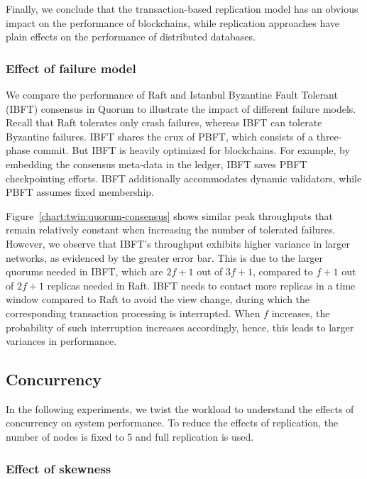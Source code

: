 Finally, we conclude that the transaction-based replication model has an obvious
impact on the performance of blockchains, while replication approaches have plain
effects on the performance of distributed databases.

\subsubsection{Effect of failure model}
\label{sec:twin:exp:replication:consensus}
We compare the performance of Raft and Istanbul Byzantine Fault Tolerant (IBFT)
consensus in Quorum to illustrate the impact of different failure models.
Recall that Raft tolerates only crash failures, whereas IBFT can tolerate
Byzantine failures.
IBFT shares the crux of PBFT, which consists of a three-phase commit.
But IBFT is heavily optimized for blockchains.
For example, by embedding the consensus meta-data in the ledger, IBFT saves PBFT
checkpointing efforts.
IBFT additionally accommodates dynamic validators, while PBFT assumes fixed
membership.


Figure~\ref{chart:twin:quorum-consensus} shows similar peak throughputs that remain
relatively constant when increasing the number of tolerated failures.
However, we observe that IBFT's throughput exhibits higher variance in larger
networks, as evidenced by the greater error bar. This is due to the larger
quorums needed in IBFT, which are $2f+1$ out of $3f+1$, compared to $f+1$ out of
$2f+1$ replicas needed in Raft.
IBFT needs to contact more replicas in a time window compared to Raft to avoid
the view change, during which the corresponding transaction processing is
interrupted.
When $f$ increases, the probability of such interruption increases accordingly,
hence, this leads to larger variances in performance.

\subsection{Concurrency} 
\label{sec:twin:exp:concurrency}
In the following experiments, we twist the workload to understand the effects of
concurrency on system performance.
To reduce the effects of replication, the number of nodes is fixed to 5 and full
replication is used.

\subsubsection{Effect of skewness}

